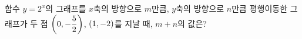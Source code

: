 함수 $y=2^{x}$의 그래프를 $x$축의 방향으로 $m$만큼, $y$축의 방향으로 $n$만큼 평행이동한 그래프가 두 점 $\left(0{,}\mkern3mu\mathopen{}-\dfrac{5}{2}\right)$, $(1{,}\mkern3mu\mathopen{}-2)$를 지날 때, $m+n$의 값은?
